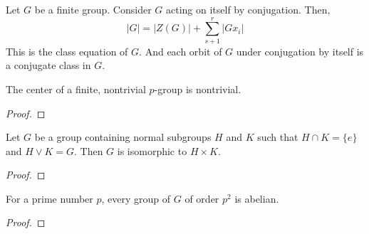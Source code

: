 \begin{definition}
	Let $G$ be a finite group.
	Consider $G$ acting on itself by conjugation. Then,
	\begin{equation}|G| = |Z(G)| + \sum_{s+1}^r |Gx_i|
	\end{equation}
	This is the class equation of $G$.
	And each orbit of $G$ under conjugation by itself is a conjugate class in $G$.
\end{definition}

\begin{theorem}
	The center of a finite, nontrivial $p$-group is nontrivial.
\end{theorem}
\begin{proof}
\end{proof}

\begin{lemma}
	Let $G$ be a group containing normal subgroups $H$ and $K$ such that $H \cap K = \{e\}$ and $H \vee K = G$.
	Then $G$ is isomorphic to $H \times K$.
\end{lemma}
\begin{proof}
\end{proof}

\begin{theorem}
	For a prime number $p$, every group of $G$ of order $p^2$ is abelian.
\end{theorem}
\begin{proof}
\end{proof}
